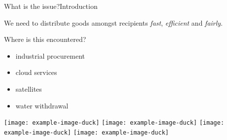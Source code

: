 \begin{frame}{What is the issue?}{Introduction}
	\adjustfortopblock
	\begin{block}{}
		We need to distribute goods amongst recipients \emph{fast}, \emph{efficient} and \emph{fairly}.
	\end{block}

	Where is this encountered?
	\begin{itemize}
		\item
		industrial procurement

		\item
		cloud services

		\item
		satellites

		\item
		water withdrawal
	\end{itemize}

	\begin{center}
		\texttt{[image: example-image-duck]}
		\hfil
		\texttt{[image: example-image-duck]}
		\hfil
		\texttt{[image: example-image-duck]}
		\hfil
		\texttt{[image: example-image-duck]}
	\end{center}
\end{frame}